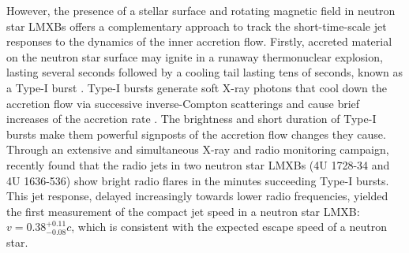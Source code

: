 \documentclass[fleqn,usenatbib]{mnras}
\begin{document}
However, the presence of a stellar surface and rotating magnetic field in neutron star LMXBs offers a complementary approach to track the short-time-scale jet responses to the dynamics of the inner accretion flow. Firstly, accreted material on the neutron star surface may ignite in a runaway thermonuclear explosion, lasting several seconds followed by a cooling tail lasting tens of seconds, known as a Type-I burst \citep[e.g.,][]{galloway2021}. Type-I bursts generate soft X-ray photons that cool down the accretion flow via successive inverse-Compton scatterings \citep{kajava2017,sanchez2020} and cause brief increases of the accretion rate \citep{degenaar2018,fragile2018,fragile2020}. The brightness and short duration of Type-I bursts make them powerful signposts of the accretion flow changes they cause. Through an extensive and simultaneous X-ray and radio monitoring campaign, \citet{russell2024} recently found that the radio jets in two neutron star LMXBs (4U 1728-34 and 4U 1636-536) show bright radio flares in the minutes succeeding Type-I bursts. This jet response, delayed increasingly towards lower radio frequencies, yielded the first measurement of the compact jet speed in a neutron star LMXB: $v=0.38^{+0.11}_{-0.08}c$, which is consistent with the expected escape speed of a neutron star. 
\end{document}
